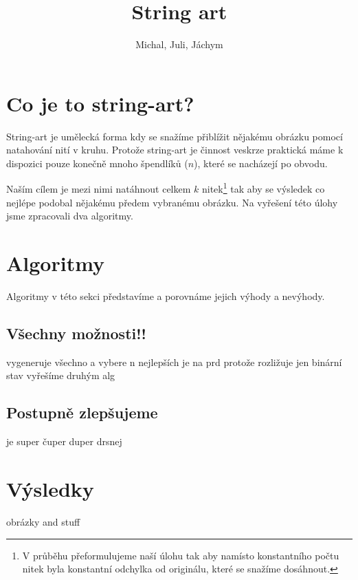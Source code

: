 \documentclass{article}
\author{Michal, Juli, Jáchym}
\title{String art}
\begin{document}
\maketitle

\section{Co je to string-art?}
\label{sec:string-art}
String-art je umělecká forma kdy se snažíme přiblížit nějakému obrázku pomocí
natahování nití v kruhu. Protože string-art je činnost veskrze praktická máme k
dispozici pouze konečně mnoho špendlíků ($n$), které se nacházejí po obvodu.

Naším cílem je mezi nimi natáhnout celkem $k$ nitek\footnote{V průběhu
	přeformulujeme naší úlohu tak aby namísto konstantního počtu nitek byla konstantní
	odchylka od originálu, které se snažíme dosáhnout.} tak aby se výsledek co
nejlépe podobal nějakému předem vybranému obrázku. Na vyřešení této úlohy jsme
zpracovali dva algoritmy.


\section{Algoritmy}
\label{sec:algoritmy}
Algoritmy v této sekci představíme a porovnáme jejich výhody a nevýhody.

\subsection{Všechny možnosti!!}
\label{ssec:vsechny-moznosti}
vygeneruje všechno a vybere n nejlepších
je na prd protože rozližuje jen binární stav
vyřešíme druhým alg
\subsection{Postupně zlepšujeme}
\label{ssec:postupne-zlepsujeme}
je super čuper duper drsnej

\section{Výsledky}
\label{sec:vysledky}
obrázky and stuff
\end{document}
